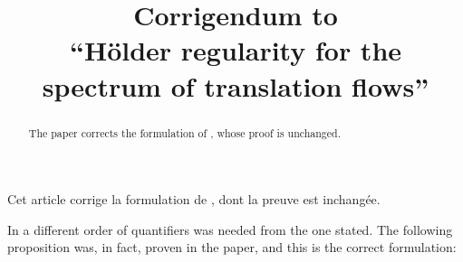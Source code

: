 \documentclass[JEP,XML,SOM,Unicode]{cedram}
\theoremstyle{plain}
\begin{document}
\frontmatter
\title[Corrigendum to ``Hölder regularity for the spectrum of translation flows'']{Corrigendum to\\ ``Hölder regularity for the spectrum of translation flows''}

\author[\initial{A.} \middlename {I.} \lastname{Bufetov}]{  }
\address{Aix-Marseille Université, CNRS, Centrale Marseille, I2M, UMR 7373,\\
39 rue F. Joliot Curie, Marseille, France\\
Steklov Mathematical Institute of RAS, Moscow, Russia\\
Institute for Information Transmission Problems, Moscow, Russia}

\author[\initial{B.} \lastname{Solomyak}]{ }
\address{Department of Mathematics, Bar-Ilan University\\
Ramat-Gan, Israel}

\begin{abstract}
The paper corrects the formulation of \cite[Prop.\,5.4]{BuSo21}, whose proof is unchanged.
\end{abstract}





\begin{altabstract}
Cet article corrige la formulation de \cite[Prop.\,5.4]{BuSo21}, dont la preuve est inchangée.
\end{altabstract}

\maketitle
\mainmatter
In \cite[Prop.\,5.4]{BuSo21} a different order of quantifiers was needed from the one stated. The following proposition was, in fact, proven in the paper, and this is the correct formulation:
\end{document}
